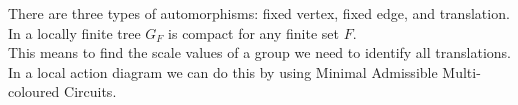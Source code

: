 \documentclass[preview]{standalone}
\begin{document}
There are three types of automorphisms: fixed vertex, fixed edge, and translation.\\In a locally finite tree $G_F$ is compact for any finite set $F$.\\This means to find the scale values of a group we need to identify all translations.\\In a local action diagram we can do this by using Minimal Admissible Multi-coloured Circuits.\\
\end{document}
